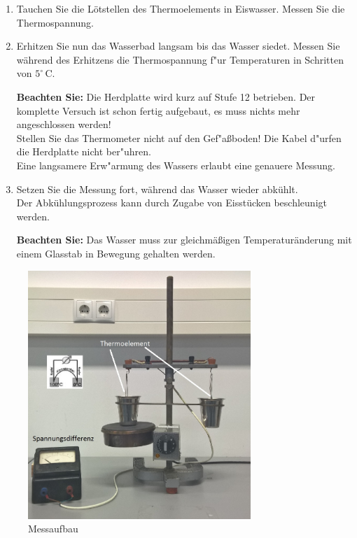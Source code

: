 \begin{enumerate}
 \item Tauchen Sie die Lötstellen des Thermoelements in Eiswasser. Messen Sie die Thermospannung.
 \item Erhitzen Sie nun das Wasserbad langsam bis das Wasser siedet. Messen Sie während des Erhitzens die Thermospannung f"ur Temperaturen in Schritten von $5^{\circ}$\,C.
 
 \noindent
 \textbf{Beachten Sie:} Die Herdplatte wird kurz auf Stufe 12 betrieben. Der komplette Versuch ist schon fertig aufgebaut, es muss nichts mehr angeschlossen werden!\\
 Stellen Sie das Thermometer nicht auf den Gef"a{\ss}boden! Die Kabel d"urfen die Herdplatte nicht ber"uhren.\\
 Eine langsamere Erw"armung des Wassers erlaubt eine genauere Messung.
 \item Setzen Sie die Messung fort, während das Wasser wieder abkühlt. \\
 Der Abkühlungsprozess kann durch Zugabe von Eisstücken beschleunigt werden.
 
 \noindent
 \textbf{Beachten Sie:} Das Wasser muss zur gleichmäßigen Temperaturänderung mit einem Glasstab in Bewegung gehalten werden.
\end{enumerate}
\begin{figure}[h!]
	\centering
		\includegraphics[width=0.75\textwidth]{Abbildungen/Thermoelement_Aufbau2.JPG}
	\caption{Messaufbau}
	\label{fig:Messung}
\end{figure}

